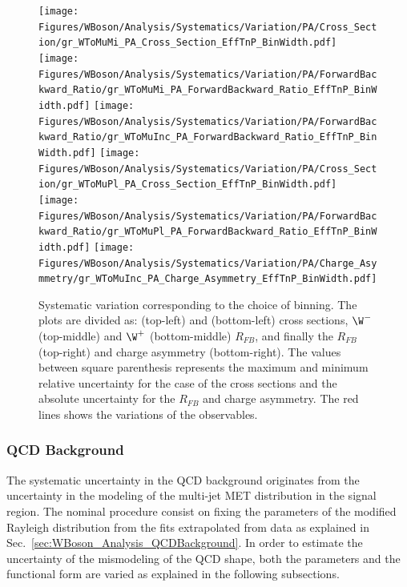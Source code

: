 \begin{figure}[htbp]
 \begin{center}
  \texttt{[image: Figures/WBoson/Analysis/Systematics/Variation/PA/Cross\_Section/gr\_WToMuMi\_PA\_Cross\_Section\_EffTnP\_BinWidth.pdf]}
  \texttt{[image: Figures/WBoson/Analysis/Systematics/Variation/PA/ForwardBackward\_Ratio/gr\_WToMuMi\_PA\_ForwardBackward\_Ratio\_EffTnP\_BinWidth.pdf]}
  \texttt{[image: Figures/WBoson/Analysis/Systematics/Variation/PA/ForwardBackward\_Ratio/gr\_WToMuInc\_PA\_ForwardBackward\_Ratio\_EffTnP\_BinWidth.pdf]}
  \texttt{[image: Figures/WBoson/Analysis/Systematics/Variation/PA/Cross\_Section/gr\_WToMuPl\_PA\_Cross\_Section\_EffTnP\_BinWidth.pdf]}
  \texttt{[image: Figures/WBoson/Analysis/Systematics/Variation/PA/ForwardBackward\_Ratio/gr\_WToMuPl\_PA\_ForwardBackward\_Ratio\_EffTnP\_BinWidth.pdf]}
  \texttt{[image: Figures/WBoson/Analysis/Systematics/Variation/PA/Charge\_Asymmetry/gr\_WToMuInc\_PA\_Charge\_Asymmetry\_EffTnP\_BinWidth.pdf]}
 \end{center}
 \caption{Systematic variation corresponding to the choice of binning. The plots are divided as: \WToMuNuMi (top-left) and \WToMuNuPl (bottom-left) cross sections, $\W^{-}$ (top-middle) and $\W^{+}$ (bottom-middle) $R_{FB}$, and finally the \W $R_{FB}$ (top-right) and \W charge asymmetry (bottom-right). The values between square parenthesis represents the maximum and minimum relative uncertainty for the case of the cross sections and the absolute uncertainty for the $R_{FB}$ and charge asymmetry. The red lines shows the variations of the observables.}
 \label{fig:Systematic_BinWidth}
\end{figure}


\clearpage
\subsubsection{QCD Background}

The systematic uncertainty in the QCD background originates from the uncertainty in the modeling of the multi-jet MET distribution in the signal region. The nominal procedure consist on fixing the parameters of the modified Rayleigh distribution from the fits extrapolated from data as explained in Sec.~\ref{sec:WBoson_Analysis_QCDBackground}. In order to estimate the uncertainty of the mismodeling of the QCD shape, both the parameters and the functional form are varied as explained in the following subsections.

